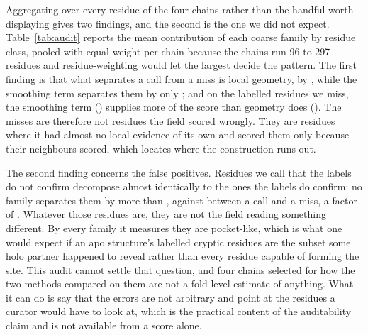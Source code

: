 \documentclass[11pt]{article}
\begin{document}
Aggregating over every residue of the four chains rather than the handful worth
displaying gives two findings, and the second is the one we did not expect.
Table~\ref{tab:audit} reports the mean contribution of each coarse family by
residue class, pooled with equal weight per chain because the chains run 96 to 297
residues and residue-weighting would let the largest decide the pattern. The
first finding is that what separates a call from a miss is local geometry, by
\AudGeomMargin{}, while the smoothing term separates them by only
\AudGateMargin{}; and on the labelled residues we miss, the smoothing term
(\AudMissGate{}) supplies more of the score than geometry does (\AudMissGeom{}).
The misses are therefore not residues the field scored wrongly. They are residues
where it had almost no local evidence of its own and scored them only because
their neighbours scored, which locates where the construction runs out.

The second finding concerns the false positives. Residues we call that the labels
do not confirm decompose almost identically to the ones the labels do confirm: no
family separates them by more than \AudGapToFP{}, against \AudGapToMiss{} between
a call and a miss, a factor of \AudGapRatio{}. Whatever those residues are, they
are not the field reading something different. By every family it measures they
are pocket-like, which is what one would expect if an apo structure's labelled
cryptic residues are the subset some holo partner happened to reveal rather than
every residue capable of forming the site. This audit cannot settle that
question, and four chains selected for how the two methods compared on them are
not a fold-level estimate of anything. What it can do is say that the errors are
not arbitrary and point at the residues a curator would have to look at, which is
the practical content of the auditability claim and is not available from a score
alone.
\end{document}
